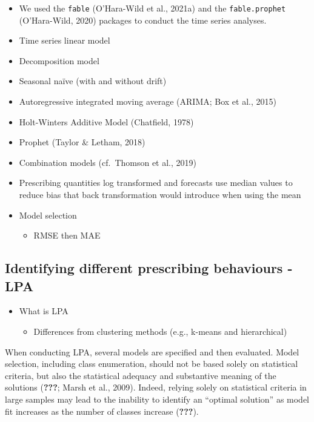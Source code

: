 \documentclass[
  english,
  man,floatsintext]{apa7}
\providecommand{\tightlist}{%
  \setlength{\itemsep}{0pt}\setlength{\parskip}{0pt}}
\begin{document}
\begin{itemize}
  \begin{itemize}
  \tightlist
  \item
    We used the \texttt{fable} (O'Hara-Wild et al., 2021a) and the \texttt{fable.prophet} (O'Hara-Wild, 2020) packages to conduct the time series analyses.
  \item
    Time series linear model
  \item
    Decomposition model
  \item
    Seasonal naïve (with and without drift)
  \item
    Autoregressive integrated moving average (ARIMA; Box et al., 2015)
  \item
    Holt-Winters Additive Model (Chatfield, 1978)
  \item
    Prophet (Taylor \& Letham, 2018)
  \item
    Combination models (cf.~Thomson et al., 2019)
  \item
    Prescribing quantities log transformed and forecasts use median values to reduce bias that back transformation would introduce when using the mean
  \item
    Model selection

    \begin{itemize}
    \tightlist
    \item
      RMSE then MAE
    \end{itemize}
  \end{itemize}
\end{itemize}

\hypertarget{identifying-different-prescribing-behaviours---lpa}{%
\subsection{Identifying different prescribing behaviours - LPA}\label{identifying-different-prescribing-behaviours---lpa}}

\begin{itemize}
\tightlist
\item
  What is LPA

  \begin{itemize}
  \tightlist
  \item
    Differences from clustering methods (e.g., k-means and hierarchical)
  \end{itemize}
\end{itemize}

When conducting LPA, several models are specified and then evaluated. Model selection, including class enumeration, should not be based solely on statistical criteria, but also the statistical adequacy and substantive meaning of the solutions ({\textbf{???}}; Marsh et al., 2009). Indeed, relying solely on statistical criteria in large samples may lead to the inability to identify an \enquote{optimal solution} as model fit increases as the number of classes increase ({\textbf{???}}).
\end{document}
